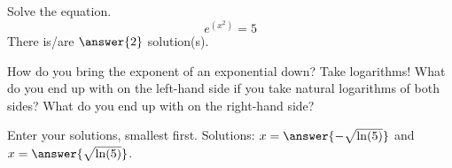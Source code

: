 \documentclass{ximera}
\author{Bobby Ramsey}
\begin{document}
\begin{exercise}
	Solve the equation.
	\[ e^{(x^2)} = 5 \]
	There is/are $\answer{2}$ solution(s).
	\begin{hint}
		How do you bring the exponent of an exponential down?  Take logarithms!  What do you end up with on the left-hand side if you
		take natural logarithms of both sides?  What do you end up with on the right-hand side?
	\end{hint}
	\begin{exercise}
		Enter your solutions, smallest first.
		Solutions: $x = \answer{- \sqrt{\ln(5)} }$ and $x = \answer{ \sqrt{\ln(5)} }$.
	\end{exercise}
\end{exercise}
\end{document}
